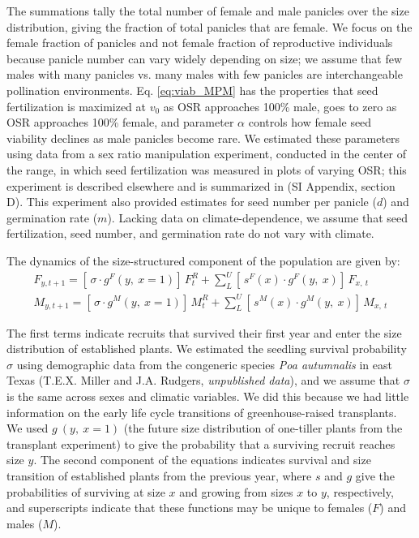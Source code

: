 \documentclass[9pt,twocolumn,twoside,lineno]{pnas-new}
\begin{document}
The summations tally the total number of female and male panicles over the size distribution, giving the fraction of total panicles that are female. 
We focus on the female fraction of panicles and not female fraction of reproductive individuals because panicle number can vary widely depending on size; we assume that few males with many panicles vs. many males with few panicles are interchangeable pollination environments. 
Eq. \ref{eq:viab_MPM} has the properties that seed fertilization is maximized at $v_{0}$ as OSR approaches 100\% male, goes to zero as OSR approaches 100\% female, and parameter $\alpha$ controls how female seed viability declines as male panicles become rare. 
We estimated these parameters using data from a sex ratio manipulation experiment, conducted in the center of the range, in which seed fertilization was measured in plots of varying OSR; this experiment is described elsewhere  \citep{compagnoni2017can} and is summarized in (SI Appendix, section D).
This experiment also provided estimates for seed number per panicle ($d$) and germination rate ($m$). 
Lacking data on climate-dependence, we assume that seed fertilization, seed number, and germination rate do not vary with climate.  

The dynamics of the size-structured component of the population are given by:
\begin{align}\label{eq:dynamics}
F_{y,t+1} = [ \, \sigma \cdot g^{F}(y,\ x=1) ] \, F^{R}_{t} + \sum_{L}^{U} 	[ \, s^{F}(x) \cdot g^{F}(y,\ x)] \, F_{x,\ t}
\\
M_{y,t+1} = [ \, \sigma \cdot g^{M}(y,\ x=1) ] \, M^{R}_{t} + \sum_{L}^{U} 	[ \,  s^{M}(x) \cdot g^{M}(y,\ x) ] \, M_{x,\ t}
\end{align}

\noindent The first terms indicate recruits that survived their first year and enter the size distribution of established plants.
We estimated the seedling survival probability $\sigma$ using demographic data from the congeneric species \textit{Poa autumnalis} in east Texas (T.E.X. Miller and J.A. Rudgers, \textit{unpublished data}), and we assume that $\sigma$ is the same across sexes and climatic variables. 
We did this because we had little information on the early life cycle transitions of greenhouse-raised transplants.
We used $g\ (y,\ x=1)$ (the future size distribution of one-tiller plants from the transplant experiment) to give the probability that a surviving recruit reaches size $y$.
The second component of the equations indicates survival and size transition of established plants from the previous year, where $s$ and $g$ give the probabilities of surviving at size $x$ and growing from sizes $x$ to $y$, respectively, and superscripts indicate that these functions may be unique to females ($F$) and males ($M$).
\end{document}
